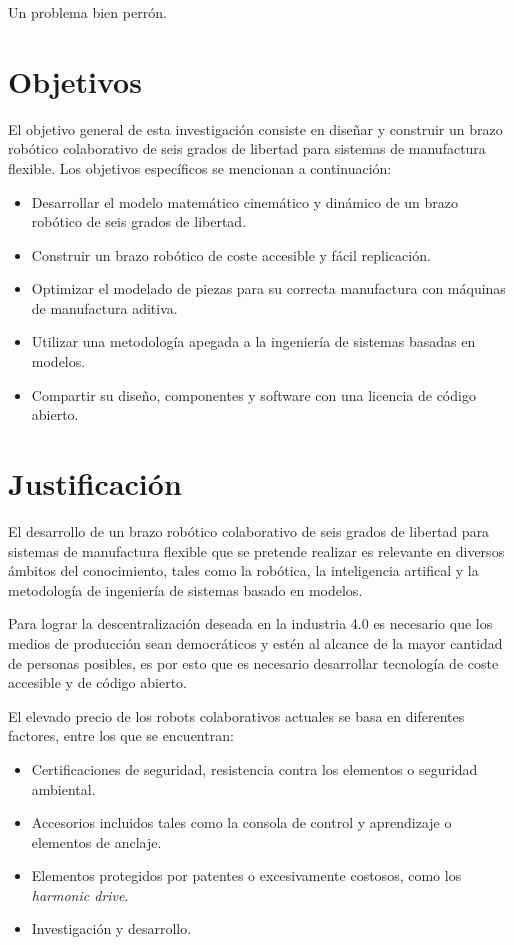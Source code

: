 Un problema bien perrón.

\section{Objetivos}

El objetivo general de esta investigación consiste en diseñar y construir un brazo robótico colaborativo de seis grados de libertad para sistemas de manufactura flexible. Los objetivos específicos se mencionan a continuación:

\begin{itemize}
\item Desarrollar el modelo matemático cinemático y dinámico de un brazo robótico de seis grados de libertad.
\item Construir un brazo robótico de coste accesible y fácil replicación.
\item Optimizar el modelado de piezas para su correcta manufactura con máquinas de manufactura aditiva.
\item Utilizar una metodología apegada a la ingeniería de sistemas basadas en modelos.
\item Compartir su diseño, componentes y software con una licencia de código abierto. 
\end{itemize}

\section{Justificación}

El desarrollo de un brazo robótico colaborativo de seis grados de libertad para sistemas de manufactura flexible que se pretende realizar es relevante en diversos ámbitos del conocimiento, tales como la robótica, la inteligencia artifical y la metodología de ingeniería de sistemas basado en modelos.

Para lograr la descentralización deseada en la industria 4.0 es necesario que los medios de producción sean democráticos y estén al alcance de la mayor cantidad de personas posibles, es por esto que es necesario desarrollar tecnología de coste accesible y de código abierto.

El elevado precio de los robots colaborativos actuales se basa en diferentes factores, entre los que se encuentran:

\begin{itemize}
\item Certificaciones de seguridad, resistencia contra los elementos o seguridad ambiental.
\item Accesorios incluidos tales como la consola de control y aprendizaje o elementos de anclaje.
\item Elementos protegidos por patentes o excesivamente costosos, como los \textit{harmonic drive}.
\item Investigación y desarrollo.
\end{itemize}

